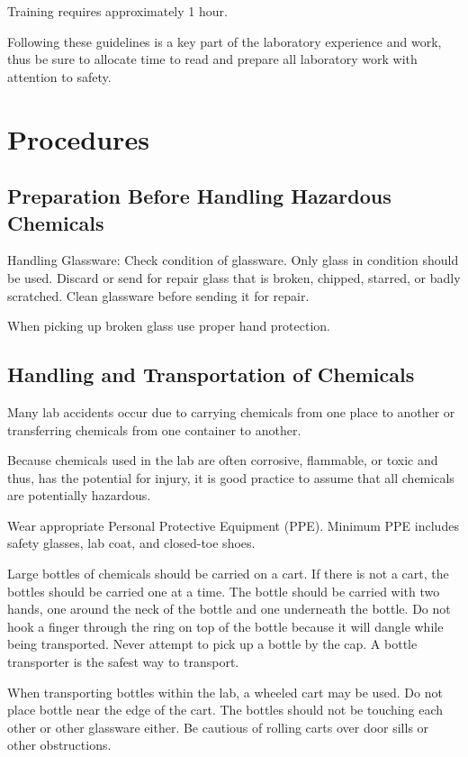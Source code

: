 \documentclass[12pt]{../SOP2}
\begin{document}
\NP Training requires approximately 1 hour.

\NP Following these guidelines is a key part of the laboratory experience and work, thus be sure to allocate time to read and prepare all laboratory work with attention to safety.

\section{Procedures}

\subsection*{Preparation Before Handling Hazardous Chemicals}

\NP Handling Glassware: Check condition of glassware. Only glass in condition should be used. Discard or send for repair glass that is broken, chipped, starred, or badly scratched. Clean glassware before sending it for repair. 

\NP When picking up broken glass use proper hand protection.

\subsection*{Handling and Transportation of Chemicals}

\NP Many lab accidents occur due to carrying chemicals from one place to another or transferring chemicals from one container to another. 

\NP Because chemicals used in the lab are often corrosive, flammable, or toxic and thus, has the potential for injury, it is good practice to assume that all chemicals are potentially hazardous. 

\NP Wear appropriate Personal Protective Equipment (PPE). Minimum PPE includes safety glasses, lab coat, and closed-toe shoes.

\NP Large bottles of chemicals should be carried on a cart. If there is not a cart, the bottles should be carried one at a time. The bottle should be carried with two hands, one around the neck of the bottle and one underneath the bottle. Do not hook a finger through the ring on top of the bottle because it will dangle while being transported. Never attempt to pick up a bottle by the cap. A bottle transporter is the safest way to transport. 

\NP When transporting bottles within the lab, a wheeled cart may be used. Do not place bottle near the edge of the cart. The bottles should not be touching each other or other glassware either. Be cautious of rolling carts over door sills or other obstructions.
\end{document}
